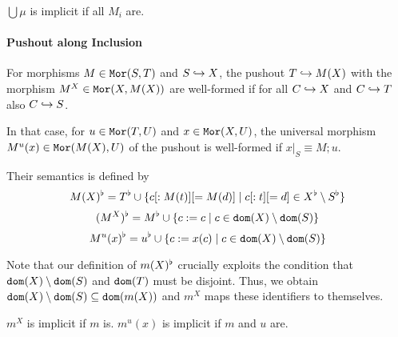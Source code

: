 $\bigcup \mu$ is implicit if all $M_i$ are.

\paragraph{Pushout along Inclusion}
For morphisms $M\in\mathtt{Mor}(S,T)$ and $S\hookrightarrow X$, the pushout $T\hookrightarrow M(X)$ with the morphism $M^X\in\mathtt{Mor}(X,M(X))$ are well-formed if for all $C\hookrightarrow X$ and $C\hookrightarrow T$ also $C\hookrightarrow S$.

In that case, for $u\in\mathtt{Mor}(T,U)$ and $x\in\mathtt{Mor}(X,U)$, the universal morphism $M^u(x)\in\mathtt{Mor}(M(X),U)$ of the pushout is well-formed if $x|_S\equiv M;u$.

Their semantics is defined by
\[M(X)^\flat=T^\flat\cup \{c[:M(t)][=M(d)]\;|\;c[:t][=d]\in X^\flat\setminus S^\flat\}\]
\[(M^X)^\flat=M^\flat\cup\{c:=c\;|\;c\in\mathtt{dom}(X)\setminus\mathtt{dom}(S)\}\]
\[M^u(x)^\flat=u^\flat\cup\{c:=x(c)\;|\;c\in\mathtt{dom}(X)\setminus\mathtt{dom}(S)\}\]

Note that our definition of $m(X)^\flat$ crucially exploits the condition that $\mathtt{dom}(X)\setminus\mathtt{dom}(S)$ and $\mathtt{dom}(T)$ must be disjoint.
Thus, we obtain $\mathtt{dom}(X)\setminus\mathtt{dom}(S)\subseteq\mathtt{dom}(m(X))$ and $m^X$ maps these identifiers to themselves.


$m^X$ is implicit if $m$ is.
$m^u(x)$ is implicit if $m$ and $u$ are.


%  
%
%  
%

